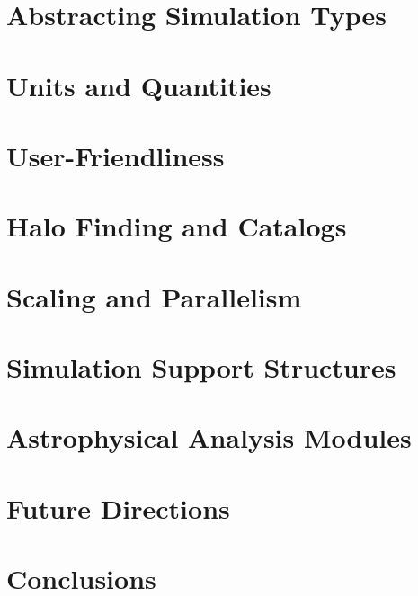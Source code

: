 \documentclass{emulateapj}
\begin{document}
\section{Abstracting Simulation Types}


\section{Units and Quantities}


\section{User-Friendliness}


\section{Halo Finding and Catalogs}


\section{Scaling and Parallelism}


\section{Simulation Support Structures}


\section{Astrophysical Analysis Modules}


\section{Future Directions}


\section{Conclusions}\label{sec:conclusions}


\acknowledgments 



\end{document}

